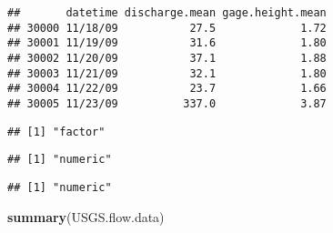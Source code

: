 \documentclass[]{article}
\newenvironment{Shaded}{\begin{snugshade}}{\end{snugshade}}
\newcommand{\KeywordTok}[1]{\textcolor[rgb]{0.13,0.29,0.53}{\textbf{#1}}}
\newcommand{\NormalTok}[1]{#1}
\newcommand{\OperatorTok}[1]{\textcolor[rgb]{0.81,0.36,0.00}{\textbf{#1}}}
\begin{document}
\begin{verbatim}
##       datetime discharge.mean gage.height.mean
## 30000 11/18/09           27.5             1.72
## 30001 11/19/09           31.6             1.80
## 30002 11/20/09           37.1             1.88
## 30003 11/21/09           32.1             1.80
## 30004 11/22/09           23.7             1.66
## 30005 11/23/09          337.0             3.87
\end{verbatim}

\begin{Shaded}
\end{Shaded}

\begin{verbatim}
## [1] "factor"
\end{verbatim}

\begin{Shaded}
\end{Shaded}

\begin{verbatim}
## [1] "numeric"
\end{verbatim}

\begin{Shaded}
\end{Shaded}

\begin{verbatim}
## [1] "numeric"
\end{verbatim}

\begin{Shaded}
\begin{Highlighting}[]
\KeywordTok{summary}\NormalTok{(USGS.flow.data)}
\end{Highlighting}
\end{Shaded}
\end{document}
